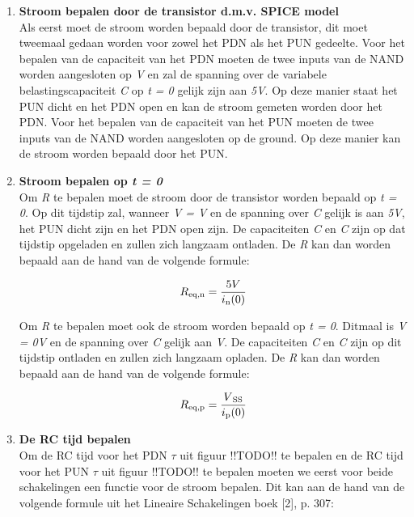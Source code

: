 \documentclass{article}
\begin{document}
\begin{enumerate}

\item \textbf{Stroom bepalen door de transistor d.m.v. SPICE model}\\
Als eerst moet de stroom worden bepaald door de transistor, dit moet tweemaal gedaan worden voor zowel het PDN als het PUN gedeelte. Voor het bepalen van de capaciteit van het PDN moeten de twee inputs van de NAND worden aangesloten op \emph{V} en zal de spanning over de variabele belastingscapaciteit \emph{C} op \emph{t = 0} gelijk zijn aan \emph{5V}. Op deze manier staat het PUN dicht en het PDN open en kan de stroom gemeten worden door het PDN. Voor het bepalen van de capaciteit van het PUN moeten de twee inputs van de NAND worden aangesloten op de ground. Op deze manier kan de stroom worden bepaald door het PUN.

\item \textbf{Stroom bepalen op \emph{t = 0}}\\
Om \emph{R} te bepalen moet de stroom door de transistor worden bepaald op \emph{t = 0}. Op dit tijdstip zal, wanneer \emph{V = V} en de spanning over \emph{C} gelijk is aan \emph{5V}, het PUN dicht zijn en het PDN open zijn.  De capaciteiten \emph{C} en \emph{C} zijn op dat tijdstip opgeladen en zullen zich langzaam ontladen. De \emph{R} kan dan worden bepaald aan de hand van de volgende formule:

\begin{equation}
R\textsubscript{eq,n} = \frac{5V}{i\textsubscript{n}(0)}
\end{equation}

Om \emph{R} te bepalen moet ook de stroom worden bepaald op \emph{t = 0}. Ditmaal is \emph{V = 0V} en de spanning over \emph{C} gelijk aan \emph{V}. De capaciteiten \emph{C} en \emph{C} zijn op dit tijdstip ontladen en zullen zich langzaam opladen. De \emph{R} kan dan worden bepaald aan de hand van de volgende formule:

\begin{equation}
R\textsubscript{eq,p} = \frac{V\textsubscript{SS}}{i\textsubscript{p}(0)}
\end{equation}

\item \textbf{De RC tijd bepalen}\\
Om de RC tijd voor het PDN $\tau$ uit figuur !!TODO!! te bepalen en de RC tijd voor het PUN $\tau$ uit figuur !!TODO!! te bepalen moeten we eerst voor beide schakelingen een functie voor de stroom bepalen. Dit kan aan de hand van de volgende formule uit het Lineaire Schakelingen boek [2], p. 307:


\end{enumerate}
\end{document}
